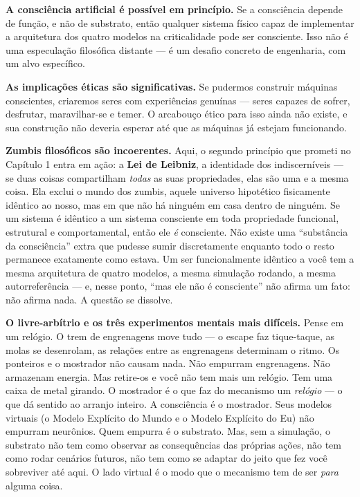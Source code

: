 \documentclass[11pt, twoside, openright]{book}
\begin{document}
\textbf{A consciência artificial é possível em princípio.} Se a consciência depende de função, e não de substrato, então qualquer sistema físico capaz de implementar a arquitetura dos quatro modelos na criticalidade pode ser consciente. Isso não é uma especulação filosófica distante --- é um desafio concreto de engenharia, com um alvo específico.

\textbf{As implicações éticas são significativas.} Se pudermos construir máquinas conscientes, criaremos seres com experiências genuínas --- seres capazes de sofrer, desfrutar, maravilhar-se e temer. O arcabouço ético para isso ainda não existe, e sua construção não deveria esperar até que as máquinas já estejam funcionando.

\textbf{Zumbis filosóficos são incoerentes.} Aqui, o segundo princípio que prometi no Capítulo 1 entra em ação: a \textbf{Lei de Leibniz}, a identidade dos indiscerníveis --- se duas coisas compartilham \textit{todas} as suas propriedades, elas são uma e a mesma coisa. Ela exclui o mundo dos zumbis, aquele universo hipotético fisicamente idêntico ao nosso, mas em que não há ninguém em casa dentro de ninguém. Se um sistema é idêntico a um sistema consciente em toda propriedade funcional, estrutural e comportamental, então ele \textit{é} consciente. Não existe uma ``substância da consciência'' extra que pudesse sumir discretamente enquanto todo o resto permanece exatamente como estava. Um ser funcionalmente idêntico a você tem a mesma arquitetura de quatro modelos, a mesma simulação rodando, a mesma autorreferência --- e, nesse ponto, ``mas ele não é consciente'' não afirma um fato: não afirma nada. A questão se dissolve.

\textbf{O livre-arbítrio e os três experimentos mentais mais difíceis.} Pense em um relógio. O trem de engrenagens move tudo --- o escape faz tique-taque, as molas se desenrolam, as relações entre as engrenagens determinam o ritmo. Os ponteiros e o mostrador não causam nada. Não empurram engrenagens. Não armazenam energia. Mas retire-os e você não tem mais um relógio. Tem uma caixa de metal girando. O mostrador é o que faz do mecanismo um \textit{relógio} --- o que dá sentido ao arranjo inteiro. A consciência é o mostrador. Seus modelos virtuais (o Modelo Explícito do Mundo e o Modelo Explícito do Eu) não empurram neurônios. Quem empurra é o substrato. Mas, sem a simulação, o substrato não tem como observar as consequências das próprias ações, não tem como rodar cenários futuros, não tem como se adaptar do jeito que fez você sobreviver até aqui. O lado virtual é o modo que o mecanismo tem de ser \textit{para} alguma coisa.
\end{document}
